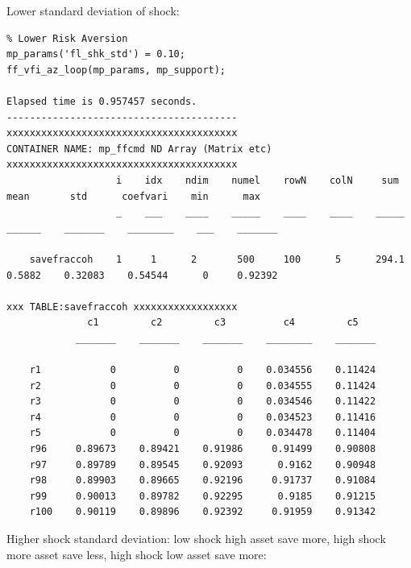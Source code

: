 \documentclass[
]{book}
\begin{document}
Lower standard deviation of shock:

\begin{verbatim}
% Lower Risk Aversion
mp_params('fl_shk_std') = 0.10;
ff_vfi_az_loop(mp_params, mp_support);

Elapsed time is 0.957457 seconds.
----------------------------------------
xxxxxxxxxxxxxxxxxxxxxxxxxxxxxxxxxxxxxxxx
CONTAINER NAME: mp_ffcmd ND Array (Matrix etc)
xxxxxxxxxxxxxxxxxxxxxxxxxxxxxxxxxxxxxxxx
                   i    idx    ndim    numel    rowN    colN     sum      mean       std      coefvari    min      max  
                   _    ___    ____    _____    ____    ____    _____    ______    _______    ________    ___    _______

    savefraccoh    1     1      2       500     100      5      294.1    0.5882    0.32083    0.54544      0     0.92392

xxx TABLE:savefraccoh xxxxxxxxxxxxxxxxxx
              c1         c2         c3          c4         c5   
            _______    _______    _______    ________    _______

    r1            0          0          0    0.034556    0.11424
    r2            0          0          0    0.034555    0.11424
    r3            0          0          0    0.034546    0.11422
    r4            0          0          0    0.034523    0.11416
    r5            0          0          0    0.034478    0.11404
    r96     0.89673    0.89421    0.91986     0.91499    0.90808
    r97     0.89789    0.89545    0.92093      0.9162    0.90948
    r98     0.89903    0.89665    0.92196     0.91737    0.91084
    r99     0.90013    0.89782    0.92295      0.9185    0.91215
    r100    0.90119    0.89896    0.92392     0.91959    0.91342
\end{verbatim}

Higher shock standard deviation: low shock high asset save more, high
shock more asset save less, high shock low asset save more:
\end{document}
